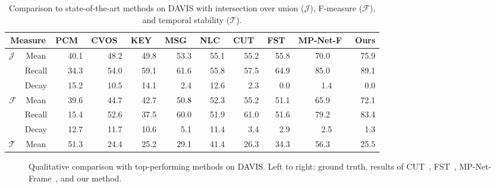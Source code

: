\documentclass[10pt,twocolumn,letterpaper]{article}
\begin{document}
\begin{table*}[t]
\begin{center}
\begin{small}
\begin{tabular}{l | c | rrrrrrrcr}
\hline
\multicolumn{2}{c|}{Measure} & PCM~\cite{Bideau16} & CVOS~\cite{taylor2015causal} & KEY~\cite{lee2011key} & MSG~\cite{brox2010object} & NLC~\cite{Faktor14} & CUT~\cite{keuper2015motion} & FST~\cite{papazoglou2013fast} & MP-Net-F~\cite{tokmakov2016learning} & Ours \\
\hline
\multirow{3}{*}{$\mathcal{J}$} & Mean  & 40.1 & 48.2 & 49.8 & 53.3 & 55.1 & 55.2 & 55.8 & 70.0 & 75.9  \\
& Recall & 34.3 & 54.0 & 59.1 & 61.6  & 55.8 & 57.5 & 64.9 & 85.0 & 89.1  \\
& Decay & 15.2 & 10.5 & 14.1 & 2.4 & 12.6 & 2.3 & 0.0 & ~~1.4 & 0.0  \\
\hline
\multirow{3}{*}{$\mathcal{F}$} & Mean  & 39.6 & 44.7 & 42.7 & 50.8 & 52.3 & 55.2 & 51.1 & 65.9 & 72.1  \\
& Recall  & 15.4 & 52.6 & 37.5 & 60.0 & 51.9 & 61.0 & 51.6 & 79.2 & 83.4  \\
& Decay  & 12.7 & 11.7 & 10.6 & 5.1 & 11.4 & 3.4 & 2.9 & ~~2.5 & 1.3  \\
\hline
$\mathcal{T}$ & Mean  & 51.3 & 24.4 & 25.2 & 29.1 & 41.4 & 26.3 & 34.3 & 56.3 & 25.5  \\
\hline
\end{tabular}
\end{small}
\vspace{0.1cm}
\caption{Comparison to state-of-the-art methods on DAVIS with intersection over
union ($\mathcal{J}$), F-measure ($\mathcal{F}$), and temporal stability
($\mathcal{T}$).}
\label{tbl:soadavis}
\vspace{-0.4cm}
\end{center}
\end{table*}

\begin{figure*}[t]
\begin{center}
\vspace{0.1cm}
\vspace{0.1cm}
\vspace{0.1cm}
\end{center}
\vspace{-0.3cm}\caption{Qualitative comparison with top-performing methods on
DAVIS. Left to right: ground truth, results of CUT~\cite{keuper2015motion},
FST~\cite{papazoglou2013fast}, MP-Net-Frame~\cite{tokmakov2016learning}, and our method.}
\vspace{-0.4cm}
\label{fig:davis}
\end{figure*}
\end{document}
